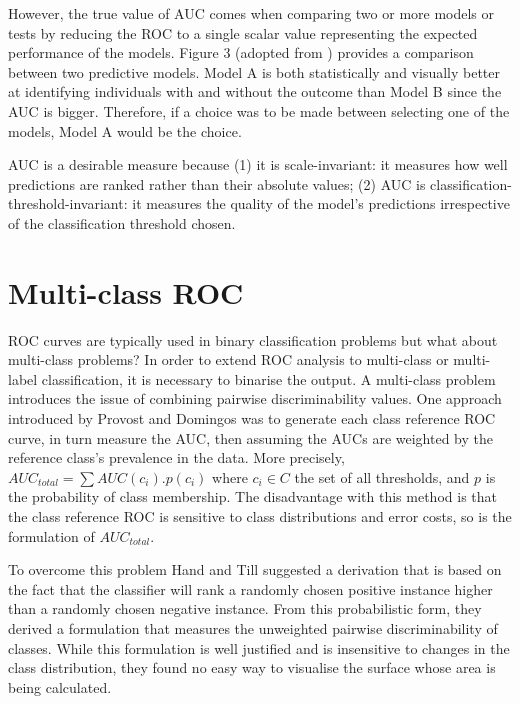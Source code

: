 However, the true value of AUC comes when comparing two or more models or tests by reducing the ROC to a single scalar value representing the expected performance of the models. Figure 3 (adopted from \citep{linden2006diagpreddismgmt}) provides a comparison between two predictive models. Model A is both statistically and visually better at identifying individuals with and without the outcome than Model B since the AUC is bigger. Therefore, if a choice was to be made between selecting one of the models, Model A would be the choice.

AUC is a desirable measure because (1) it is scale-invariant: it measures how well predictions are ranked rather than their absolute values; (2) AUC is classification-threshold-invariant: it measures the quality of the model’s predictions irrespective of the classification threshold chosen.

\section{Multi-class ROC} 
ROC curves are typically used in binary classification problems but what about multi-class problems? In order to extend ROC analysis to multi-class or multi-label classification, it is necessary to binarise the output. A multi-class problem introduces the issue of combining pairwise discriminability values. One approach introduced by Provost and Domingos \citep{provost2003treeind} was to generate each class reference ROC curve, in turn measure the AUC, then assuming the AUCs are weighted by the reference class’s prevalence in the data. More precisely, $AUC_{total} = \sum AUC(c_{i}).p(c_{i})$ where $c_{i}\in C$ the set of all thresholds, and $p$ is the probability of class membership.
The disadvantage with this method is that the class reference ROC is sensitive to class distributions and error costs, so is the formulation of $AUC_{total}$.

To overcome this problem Hand and Till \citep{hand2001aucmulticlass} suggested a derivation that is based on the fact that the classifier will rank a randomly chosen positive instance higher than a randomly chosen negative instance. From this probabilistic form, they derived a formulation that measures the unweighted pairwise discriminability of classes. While this formulation is well justified and is insensitive to changes in the class distribution, they found no easy way to visualise the surface whose area is being calculated.

